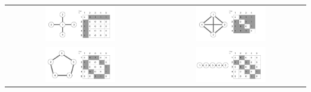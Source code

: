 \begin{table}[H]
  \centering
\begin{tabu}{cc}
	\includegraphics[width=0.49\textwidth]{images/pattern_star}  &
	\includegraphics[width=0.49\textwidth]{images/pattern_full} \\
	\includegraphics[width=0.49\textwidth]{images/pattern_circle} &
	\includegraphics[width=0.49\textwidth]{images/pattern_line} 
\end{tabu}
\end{table}
